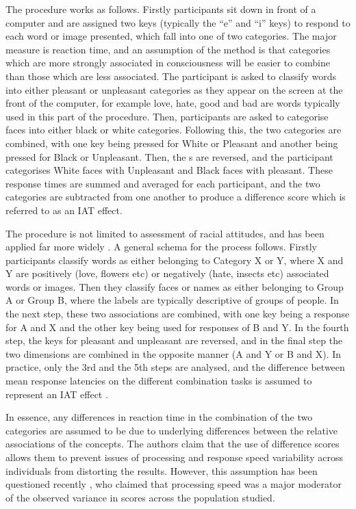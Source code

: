 The procedure works as follows. Firstly participants sit down in front of a computer and are assigned two keys (typically the ``e'' and ``i'' keys) to respond to each word or image presented, which fall into one of two categories. The major measure is reaction time, and an assumption of the method is that categories which are more strongly associated in consciousness will be easier to combine than those which are less associated.  The participant is asked to classify words into either pleasant or unpleasant categories as they appear on the screen at the front of the computer, for example love, hate, good  and bad are words typically used in this part of the procedure. Then, participants are asked to categorise faces into either black or white categories. Following this, the two categories are combined, with one key being pressed for White or Pleasant and another being pressed for Black or Unpleasant. Then, the s are reversed, and the participant categorises White faces with Unpleasant and Black faces with pleasant. These response times are summed and averaged for each participant, and the two categories are subtracted from one another to produce a difference score which is referred to as an IAT effect. 

The procedure is not limited to assessment of racial attitudes, and has been applied far more widely \cite{Craeynest2008,Greenwald2009,Schmukle2008,Walker2008}.  A general schema for the process follows.    Firstly participants classify words as either belonging to Category X or Y, where X and Y are positively (love, flowers etc) or negatively (hate, insects etc) associated words or images.  Then they classify faces or names as either belonging to Group A or Group B, where the labels are typically descriptive of groups of people.  In the next step, these two associations are combined, with one key being a response for A and X and the other key being used for responses of B and Y. In the fourth step, the keys for pleasant and unpleasant are reversed, and in the final step the two dimensions are combined in the opposite manner (A and Y or B and X). In practice, only the 3rd and the 5th steps are analysed, and the difference between mean response latencies on the different combination tasks is assumed to represent an IAT effect \cite{Greenwald1998} . 

In essence, any differences in reaction time in the combination of the two categories are assumed to be due to underlying differences between the relative associations of the concepts. The authors claim that the use of difference scores allows them to prevent issues of processing and response speed variability across individuals from distorting the results. However, this assumption has been questioned recently \cite{Blanton2006}, who claimed that processing speed was a major moderator of the observed variance in scores across the population studied.  

